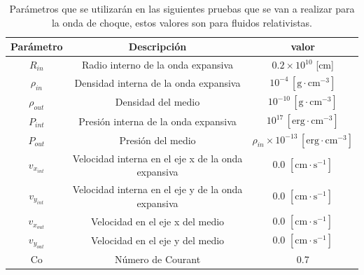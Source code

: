 \documentclass[12pt,a4paper]{book}
\begin{document}
\begin{table}[htbp]
\begin{center}
\begin{tabular}{|c|c|c|}
\hline 
\textbf{Parámetro} & \textbf{Descripción} & \textbf{valor} \\ 
\hline 
$R_{in}$ & Radio interno de la onda expansiva & $0.2\times10^{10}$ [cm] \\ 
\hline 
$\rho_{in}$ &  Densidad interna de la onda expansiva & $10^{-4} \, [\mathrm{g} \cdot \mathrm{cm}^{-3}]$ \\ 
\hline 
$\rho_{out}$ &  Densidad del medio  & $10^{-10} \, [\mathrm{g} \cdot \mathrm{cm}^{-3}]$ \\
\hline 
$P_{int}$ & Presión interna de la onda expansiva & $10^{17} \, [\mathrm{erg} \cdot \mathrm{cm}^{-3}]$ \\ 
\hline 
$P_{out}$ &  Presión del medio  & $\rho_{in} \times 10^{-13} \, [\mathrm{erg} \cdot \mathrm{cm}^{-3}]$  \\ 
\hline 
$v_{x_{int}}$ & Velocidad interna en el eje x de la onda expansiva & 0.0 $ [\mathrm{cm} \cdot \mathrm{s}^{-1}]$\\ 
\hline 
$v_{y_{int}}$ & Velocidad interna en el eje y de la onda expansiva & 0.0 $ [\mathrm{cm} \cdot \mathrm{s}^{-1}]$\\ 
\hline 
$v_{x_{out}}$ & Velocidad en el eje x del medio & 0.0 $ [\mathrm{cm} \cdot \mathrm{s}^{-1}]$ \\
\hline 
$v_{y_{out}}$ & Velocidad en el eje y del medio & 0.0 $ [\mathrm{cm} \cdot \mathrm{s}^{-1}]$\\ 
\hline 
Co & Número de Courant & 0.7 \\ 	
\hline 
\end{tabular}
\caption{\label{Tabla_parametros_relatividad}Parámetros que se utilizarán en las siguientes pruebas que se van a realizar para la onda de choque, estos valores son para fluidos relativistas.}
\end{center}
\end{table}
\end{document}
